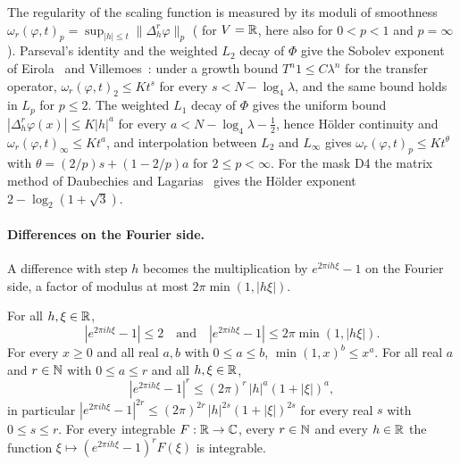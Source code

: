 The regularity of the scaling function is measured by its moduli of smoothness
$\omega_r(\varphi, t)_p = \sup_{|h| \leq t} \|\Delta_h^r \varphi\|_p$ ( for
$V = \mathbb{R}$, here also for $0 < p < 1$ and $p = \infty$). Parseval's identity and the weighted $L_2$
decay of $\Phi$ give the Sobolev exponent of Eirola~\cite{Eirola} and Villemoes~\cite{Villemoes}:
under a growth bound $T^n 1 \leq C \lambda^n$ for the transfer operator,
$\omega_r(\varphi, t)_2 \leq K t^s$ for every $s < N - \log_4 \lambda$, and the same bound holds
in $L_p$ for $p \leq 2$. The weighted $L_1$ decay of $\Phi$ gives the uniform bound
$|\Delta_h^r \varphi(x)| \leq K |h|^a$ for every $a < N - \log_4 \lambda - \frac12$, hence
H\"older continuity and $\omega_r(\varphi, t)_\infty \leq K t^a$, and interpolation between $L_2$
and $L_\infty$ gives $\omega_r(\varphi, t)_p \leq K t^\theta$ with $\theta = (2/p) s + (1 - 2/p) a$
for $2 \leq p < \infty$. For the mask D4 the matrix method of Daubechies and
Lagarias~\cite{DaubechiesLagarias} gives the H\"older exponent $2 - \log_2(1 + \sqrt 3)$.

\paragraph{Differences on the Fourier side.}
A difference with step $h$ becomes the multiplication by $e^{2\pi i h \xi} - 1$ on the Fourier
side, a factor of modulus at most $2\pi \min(1, |h \xi|)$.

\begin{lemma}
\label{lem:daub-difference-multiplier}
\leanok
For all $h, \xi \in \mathbb{R}$,
\[
  |e^{2\pi i h \xi} - 1| \leq 2 \quad\text{and}\quad
  |e^{2\pi i h \xi} - 1| \leq 2\pi \min(1, |h \xi|) .
\]
For every $x \geq 0$ and all real $a, b$ with $0 \leq a \leq b$, $\min(1, x)^b \leq x^a$. For
all real $a$ and $r \in \mathbb{N}$ with $0 \leq a \leq r$ and all $h, \xi \in \mathbb{R}$,
\[
  |e^{2\pi i h \xi} - 1|^r \leq (2\pi)^r \, |h|^a (1 + |\xi|)^a ,
\]
in particular
$|e^{2\pi i h \xi} - 1|^{2r} \leq (2\pi)^{2r} \, |h|^{2s} (1 + |\xi|)^{2s}$ for every real $s$
with $0 \leq s \leq r$. For every integrable $F : \mathbb{R} \to \mathbb{C}$, every $r \in \mathbb{N}$ and every
$h \in \mathbb{R}$ the function $\xi \mapsto (e^{2\pi i h \xi} - 1)^r F(\xi)$ is integrable.
\end{lemma}

